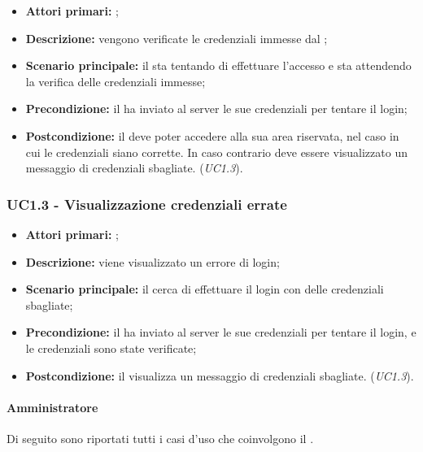 \documentclass[../analisi-dei-requisiti]{subfiles}
\begin{document}
\begin{itemize}
  \item \textbf{Attori primari:} ;
  \item \textbf{Descrizione:} vengono verificate le credenziali immesse dal ;
  \item \textbf{Scenario principale:} il  sta tentando di effettuare l'accesso e sta attendendo la verifica delle credenziali immesse;
  \item \textbf{Precondizione:} il  ha inviato al server le sue credenziali per tentare il login;
  \item \textbf{Postcondizione:} il  deve poter accedere alla sua area riservata, nel caso in cui le credenziali siano corrette. In caso
        contrario deve essere visualizzato un messaggio di credenziali sbagliate. (\emph{UC1.3}).

\end{itemize}

\subsubsection{UC1.3 - Visualizzazione credenziali errate}
\label{subsub:UC1.3}

\begin{itemize}
  \item \textbf{Attori primari:} ;
  \item \textbf{Descrizione:} viene visualizzato un errore di login;
  \item \textbf{Scenario principale:} il  cerca di effettuare il login con delle credenziali sbagliate;
  \item \textbf{Precondizione:} il  ha inviato al server le sue credenziali per tentare il login, e le credenziali sono state verificate;
  \item \textbf{Postcondizione:} il  visualizza un messaggio di credenziali sbagliate. (\emph{UC1.3}).

\end{itemize}


\paragraph{Amministratore}
\label{par:amministratore}
Di seguito sono riportati tutti i casi d'uso che coinvolgono il  .
\end{document}
